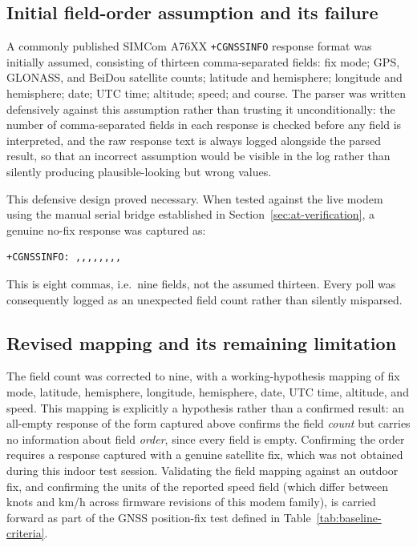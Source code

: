\subsection{Initial field-order assumption and its failure}

A commonly published SIMCom A76XX \texttt{+CGNSSINFO} response format was initially assumed, consisting of thirteen comma-separated fields: fix mode; GPS, GLONASS, and BeiDou satellite counts; latitude and hemisphere; longitude and hemisphere; date; UTC time; altitude; speed; and course. The parser was written defensively against this assumption rather than trusting it unconditionally: the number of comma-separated fields in each response is checked before any field is interpreted, and the raw response text is always logged alongside the parsed result, so that an incorrect assumption would be visible in the log rather than silently producing plausible-looking but wrong values.

This defensive design proved necessary. When tested against the live modem using the manual serial bridge established in Section~\ref{sec:at-verification}, a genuine no-fix response was captured as:

\begin{verbatim}
+CGNSSINFO: ,,,,,,,,
\end{verbatim}

This is eight commas, i.e.\ nine fields, not the assumed thirteen. Every poll was consequently logged as an unexpected field count rather than silently misparsed.

\subsection{Revised mapping and its remaining limitation}

The field count was corrected to nine, with a working-hypothesis mapping of fix mode, latitude, hemisphere, longitude, hemisphere, date, UTC time, altitude, and speed. This mapping is explicitly a hypothesis rather than a confirmed result: an all-empty response of the form captured above confirms the field \emph{count} but carries no information about field \emph{order}, since every field is empty. Confirming the order requires a response captured with a genuine satellite fix, which was not obtained during this indoor test session. Validating the field mapping against an outdoor fix, and confirming the units of the reported speed field (which differ between knots and km/h across firmware revisions of this modem family), is carried forward as part of the GNSS position-fix test defined in Table~\ref{tab:baseline-criteria}.

